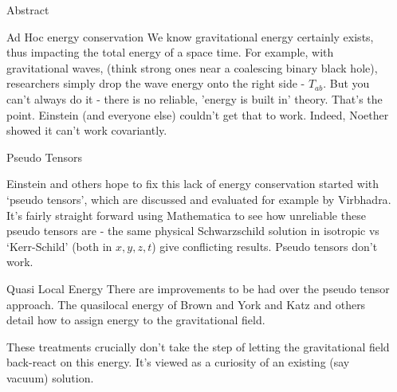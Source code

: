 \documentclass[final]{beamer}
\newlength{\sepwidth}
\newlength{\colwidth}
\newcommand{\separatorcolumn}{\begin{column}{\sepwidth}\end{column}}
\begin{document}
\begin{frame}[t]
\begin{columns}[t]
\begin{column}{\colwidth}
\begin{block}{Abstract}
  \end{block}

  \begin{block}{Ad Hoc energy conservation}
  	We know gravitational energy certainly exists, thus impacting the total energy of a space time. For example, with gravitational waves, (think strong ones near a coalescing binary black hole), researchers simply drop the wave energy onto the right side - $T_{ab}$. But you can't always do it - there is no reliable, 'energy is built in' theory. That's the point. Einstein (and everyone else) couldn't get that to work. Indeed, Noether showed it can't work covariantly\cite{haroNoethersTheoremsEnergy2021}.

  \end{block}

  \begin{block}{Pseudo Tensors}


Einstein and others hope to fix this lack of energy conservation started with `pseudo tensors', which are discussed and evaluated for example by Virbhadra\cite{virbhadraEnergyDistributionKerrNewman1990}\cite{virbhadraEnergyMomentumVaidya1992}. It's fairly straight forward using Mathematica to see how unreliable these pseudo tensors are - the same physical Schwarzschild solution in isotropic vs `Kerr-Schild' (both in $x,y,z,t$) give conflicting results\cite{RzeroMathematicaSchwarschildpseudoChecknb}. Pseudo tensors don't work.
  \end{block}

  \begin{block}{Quasi Local Energy}
There are improvements to be had over the pseudo tensor approach. The quasilocal energy of Brown and York\cite{Brown1993} and Katz\cite{Katz2005} and others \cite{haroNoethersTheoremsEnergy2021}\cite{lyndenbell1985}\cite{changPseudotensorsQuasilocalEnergymomentum1999} detail how to assign energy to the gravitational field. 

These treatments\cite{olteanMotionLocalizedSources2020} crucially don't take the step of letting the gravitational field back-react on this energy. It's viewed as a curiosity of an existing (say vacuum) solution. 
  \end{block}


\end{column}

\separatorcolumn



\end{columns}
\end{frame}
\end{document}
